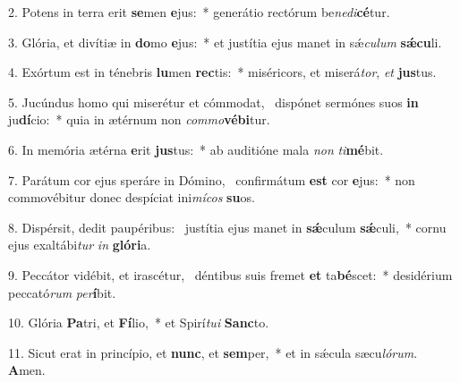 2. Potens in terra erit \textbf{se}men \textbf{e}jus:~*  generátio rectórum be\textit{ne}\textit{di}\textbf{cé}tur.\

3. Glória, et divítiæ in \textbf{do}mo \textbf{e}jus:~*  et justítia ejus manet in sǽ\textit{cu}\textit{lum} \textbf{sǽ}\textbf{cu}li.\

4. Exórtum est in ténebris \textbf{lu}men \textbf{rec}tis:~*  miséricors, et miserá\textit{tor}, \textit{et} \textbf{jus}tus.\

5. Jucúndus homo qui miserétur et cómmodat, \dag\  dispónet sermónes suos \textbf{in} ju\textbf{dí}cio:~*  quia in ætérnum non \textit{com}\textit{mo}\textbf{vé}\textbf{bi}tur.\

6. In memória ætérna \textbf{e}rit \textbf{jus}tus:~*  ab auditióne mala \textit{non} \textit{ti}\textbf{mé}bit.\

7. Parátum cor ejus speráre in Dómino, \dag\  confirmátum \textbf{est} cor \textbf{e}jus:~*  non commovébitur donec despíciat ini\textit{mí}\textit{cos} \textbf{su}os.\

8. Dispérsit, dedit paupéribus: \dag\  justítia ejus manet in \textbf{sǽ}culum \textbf{sǽ}culi,~*  cornu ejus exaltábi\textit{tur} \textit{in} \textbf{gló}\textbf{ri}a.\

9. Peccátor vidébit, et irascétur, \dag\  déntibus suis fremet \textbf{et} ta\textbf{bé}scet:~*  desidérium peccató\textit{rum} \textit{per}\textbf{í}bit.\

10. Glória \textbf{Pa}tri, et \textbf{Fí}lio,~*  et Spirí\textit{tu}\textit{i} \textbf{Sanc}to.\

11. Sicut erat in princípio, et \textbf{nunc}, et \textbf{sem}per,~*  et in sǽcula sæcu\textit{ló}\textit{rum}. \textbf{A}men.\

